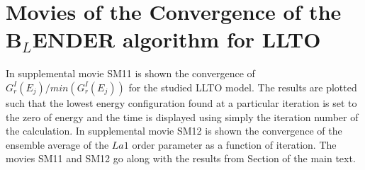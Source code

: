 \documentclass[a4paper,12pt]{article}
\begin{document}
\section{Movies of the Convergence of the B$_L$ENDER algorithm for LLTO}
In supplemental movie SM11 is shown the convergence of $G_r^I(E_j)/min(G_r^I(E_j))$ for the studied LLTO model. The results are plotted such that the lowest energy configuration found at a particular iteration is set to the zero of energy and the  time is displayed using simply the iteration number of the calculation. In supplemental movie SM12 is shown the convergence of the ensemble average of the $La1$ order parameter as a function of iteration. The movies SM11 and SM12 go along with the results from Section  of the main text. 



\end{document}
